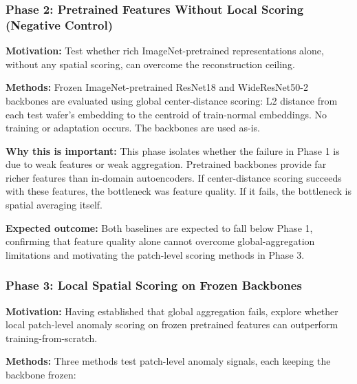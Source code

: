 \documentclass[11pt]{article}
\begin{document}
\subsubsection{Phase 2: Pretrained Features Without Local Scoring (Negative Control)}

\textbf{Motivation:} Test whether rich ImageNet-pretrained representations alone, without any spatial scoring, can
overcome the reconstruction ceiling.

\textbf{Methods:} Frozen ImageNet-pretrained ResNet18 and WideResNet50-2 backbones are evaluated using global
center-distance scoring: L2 distance from each test wafer's embedding to the centroid of train-normal embeddings.
No training or adaptation occurs. The backbones are used as-is.

\textbf{Why this is important:} This phase isolates whether the failure in Phase 1 is due to weak features or weak aggregation.
Pretrained backbones provide far richer features than in-domain autoencoders. If center-distance scoring succeeds with
these features, the bottleneck was feature quality. If it fails, the bottleneck is spatial averaging itself.

\textbf{Expected outcome:} Both baselines are expected to fall below Phase 1, confirming that feature quality alone
cannot overcome global-aggregation limitations and motivating the patch-level scoring methods in Phase 3.

\subsubsection{Phase 3: Local Spatial Scoring on Frozen Backbones}

\textbf{Motivation:} Having established that global aggregation fails, explore whether local patch-level anomaly
scoring on frozen pretrained features can outperform training-from-scratch.

\textbf{Methods:} Three methods test patch-level anomaly signals, each keeping the backbone frozen:
\end{document}
